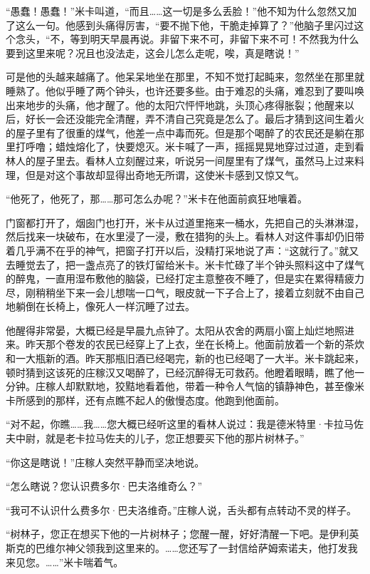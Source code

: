 \par “愚蠢！愚蠢！”米卡叫道，“而且……这一切是多么丢脸！”他不知为什么忽然又加了这么一句。他感到头痛得厉害，“要不抛下他，干脆走掉算了？”他脑子里闪过这个念头，“不，等到明天早晨再说。非留下来不可，非留下来不可！不然我为什么要到这里来呢？况且也没法走，这会儿怎么走呢，唉，真是瞎说！”
\par 可是他的头越来越痛了。他呆呆地坐在那里，不知不觉打起盹来，忽然坐在那里就睡熟了。他似乎睡了两个钟头，也许还要多些。由于难忍的头痛，难忍到了要叫唤出来地步的头痛，他才醒了。他的太阳穴怦怦地跳，头顶心疼得胀裂；他醒来以后，好长一会还没能完全清醒，弄不清自己究竟是怎么了。最后才猜到这间生着火的屋子里有了很重的煤气，他差一点中毒而死。但是那个喝醉了的农民还是躺在那里打呼噜；蜡烛熔化了，快要熄灭。米卡喊了一声，摇摇晃晃地穿过过道，走到看林人的屋子里去。看林人立刻醒过来，听说另一间屋里有了煤气，虽然马上过来料理，但是对这个事故却显得出奇地无所谓，这使米卡感到又惊又气。
\par “他死了，他死了，那……那可怎么办呢？”米卡在他面前疯狂地嚷着。
\par 门窗都打开了，烟囱门也打开，米卡从过道里拖来一桶水，先把自己的头淋淋湿，然后找来一块破布，在水里浸了一浸，敷在猎狗的头上。看林人对这件事却仍旧带着几乎满不在乎的神气，把窗子打开以后，没精打采地说了声：“这就行了。”就又去睡觉去了，把一盏点亮了的铁灯留给米卡。米卡忙碌了半个钟头照料这中了煤气的醉鬼，一直用湿布敷他的脑袋，已经打定主意整夜不睡了，但是实在累得精疲力尽，刚稍稍坐下来一会儿想喘一口气，眼皮就一下子合上了，接着立刻就不由自己地躺倒在长椅上，像死人一样沉睡了过去。
\par 他醒得非常晏，大概已经是早晨九点钟了。太阳从农舍的两扇小窗上灿烂地照进来。昨天那个卷发的农民已经穿上了上衣，坐在长椅上。他面前放着一个新的茶炊和一大瓶新的酒。昨天那瓶旧酒已经喝完，新的也已经喝了一大半。米卡跳起来，顿时猜到这该死的庄稼汉又喝醉了，已经沉醉得无可救药。他瞪着眼睛，瞧了他一分钟。庄稼人却默默地，狡黠地看着他，带着一种令人气恼的镇静神色，甚至像米卡所感到的那样，还有点瞧不起人的傲慢态度。他跑到他面前。
\par “对不起，你瞧……我……您大概已经听这里的看林人说过：我是德米特里·卡拉马佐夫中尉，就是老卡拉马佐夫的儿子，您正想要买下他的那片树林子。”
\par “你这是瞎说！”庄稼人突然平静而坚决地说。
\par “怎么瞎说？您认识费多尔·巴夫洛维奇么？”
\par “我可不认识什么费多尔·巴夫洛维奇。”庄稼人说，舌头都有点转动不灵的样子。
\par “树林子，您正在想买下他的一片树林子；您醒一醒，好好清醒一下吧。是伊利英斯克的巴维尔神父领我到这里来的。……您还写了一封信给萨姆索诺夫，他打发我来见您。……”米卡喘着气。
